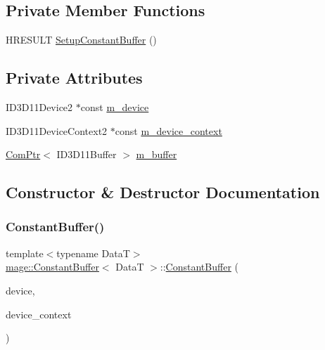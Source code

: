 \subsection*{Private Member Functions}
\begin{DoxyCompactItemize}
\item 
H\+R\+E\+S\+U\+LT \hyperlink{structmage_1_1_constant_buffer_a7fc18ea6b686aa7a1bcdb964dfe465dd}{Setup\+Constant\+Buffer} ()
\end{DoxyCompactItemize}
\subsection*{Private Attributes}
\begin{DoxyCompactItemize}
\item 
I\+D3\+D11\+Device2 $\ast$const \hyperlink{structmage_1_1_constant_buffer_a52d9b6722b8f7e20d079d5575169995f}{m\+\_\+device}
\item 
I\+D3\+D11\+Device\+Context2 $\ast$const \hyperlink{structmage_1_1_constant_buffer_a4b41661b3c7e0a5880f422cd93e822aa}{m\+\_\+device\+\_\+context}
\item 
\hyperlink{namespacemage_ae74f374780900893caa5555d1031fd79}{Com\+Ptr}$<$ I\+D3\+D11\+Buffer $>$ \hyperlink{structmage_1_1_constant_buffer_a394571e3102fe053f3357e2e218c0eda}{m\+\_\+buffer}
\end{DoxyCompactItemize}


\subsection{Constructor \& Destructor Documentation}
\hypertarget{structmage_1_1_constant_buffer_a19be787da1f12521a901821e93cd6d70}{}\label{structmage_1_1_constant_buffer_a19be787da1f12521a901821e93cd6d70} 
\subsubsection{\texorpdfstring{Constant\+Buffer()}{ConstantBuffer()}\hspace{0.1cm}{\footnotesize\ttfamily [1/3]}}
{\footnotesize\ttfamily template$<$typename DataT$>$ \\
\hyperlink{structmage_1_1_constant_buffer}{mage\+::\+Constant\+Buffer}$<$ DataT $>$\+::\hyperlink{structmage_1_1_constant_buffer}{Constant\+Buffer} (\begin{DoxyParamCaption}\item[{I\+D3\+D11\+Device2 $\ast$}]{device,  }\item[{I\+D3\+D11\+Device\+Context2 $\ast$}]{device\+\_\+context }\end{DoxyParamCaption})\hspace{0.3cm}{\ttfamily [explicit]}}

